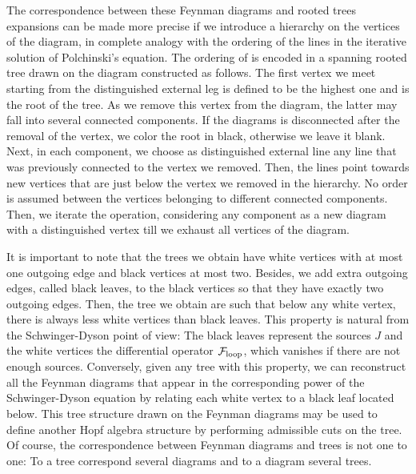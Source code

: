 \documentclass[10pt,here,feynmf]{article}
\begin{document}
The correspondence between these Feynman diagrams and rooted trees expansions can be made more precise if we introduce a hierarchy on the vertices of the diagram, in complete analogy with the ordering of the lines in the iterative solution of Polchinski's equation.  The ordering of is encoded in a spanning rooted tree drawn on the diagram constructed as follows. The first vertex we meet starting from the distinguished external leg is defined to be the highest one and is the root of the tree.  As we remove this vertex from the diagram, the latter may fall into several connected components. If the 
diagrams is disconnected after the removal of the vertex, we color the root in black, otherwise we leave it blank. Next, in each component, we choose as distinguished external line any line that was previously connected to the vertex we removed. Then, the lines point towards new vertices that are just below the vertex we removed in the hierarchy. No order is assumed between the vertices belonging to different connected components. Then, we iterate the operation, considering any component as a new 
diagram with a distinguished vertex till we exhaust all vertices of the diagram. 

It is important to note that the trees we obtain have white vertices with at most one outgoing edge and  black vertices at most two. Besides, we add extra outgoing edges, called black leaves, to the black vertices so that they have exactly two outgoing edges. Then, the tree we obtain are such that below any white vertex, there is always less  white vertices than black leaves. This property is natural from the Schwinger-Dyson point of view:
The black leaves represent the sources $J$ and the white vertices the differential operator ${\cal F}_{\mathrm{loop}}$, which vanishes if there are not enough sources.  Conversely, given any tree with this property, we can reconstruct all the Feynman diagrams that appear in the corresponding power of the Schwinger-Dyson equation by relating each white vertex to a black leaf located below. This tree structure drawn on the Feynman diagrams may be used to define another Hopf algebra structure by performing admissible cuts on the tree. Of course, the correspondence between Feynman diagrams and trees is not one to one: To a tree correspond several diagrams and to a diagram several trees.
\end{document}
